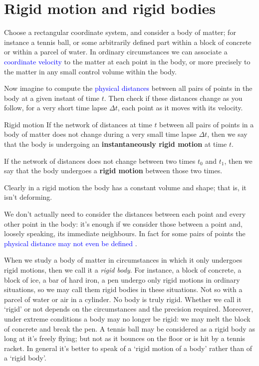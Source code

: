 \documentclass[a4paper,12pt,%
onecolumn,oneside,%
british%
]{memoir}
\newcommand*{\incr}{\Delta}%
\renewcommand*{\|}[1][]{\nonscript\:#1\vert\nonscript\:\mathopen{}}
\newcommand*{\sect}{\S}%
\renewcommand*{\autoref}[3][\sect\,\ref]{\textcolor{blue}{#3}
\raisebox{0.6ex}{\color{blue}\miniscule%
\faIcon{angle-right}%
\;#1{#2}\;p.\,\pageref{#2}}}
\newcommand*{\yti}{t_{0}}
\newcommand*{\ytf}{t_{1}}
\newcommand*{\Dt}{\incr t}
\begin{document}
\section{Rigid motion and rigid bodies}
\label{sec:rigid_bodies}

Choose a rectangular coordinate system, and consider a body of matter; for instance a tennis ball, or some arbitrarily defined part within a block of concrete or within a parcel of water. In ordinary circumstances we can associate a \autoref{sec:fluxes_velocities}{coordinate velocity} to the matter at each point in the body, or more precisely to the matter in any small control volume within the body.

Now imagine to compute the \autoref{sec:radar_distance}{physical distances} between all pairs of points in the body at a given instant of time $t$. Then check if these distances change as you follow, for a very short time lapse $\Dt$,  each point as it moves with its velocity.
%
\begin{definition}{Rigid motion}\label{def:rigid_motion}
  If the network of distances at time $t$ between all pairs of points in a body of matter does not change during a very small time lapse $\Dt$, then we say that  the body is undergoing an \textbf{instantaneously rigid motion} at time $t$.

  \smallskip

  If the network of distances does not change between two times $\yti$ and $\ytf$, then we say that the body undergoes a \textbf{rigid motion} between those two times.
\end{definition}
Clearly in a rigid motion the body has a constant volume and shape; that is, it isn't deforming.

We don't actually need to consider the distances between each point and every other point in the body: it's enough if we consider those between a point and, loosely speaking, its immediate neighbours. In fact for some pairs of points the \autoref{sec:radar_distance}{physical distance may not even be defined}.

When we study a body of matter in circumstances in which it only undergoes rigid motions, then we call it a \emph{rigid body}. For instance, a block of concrete, a block of ice, a bar of hard iron, a pen undergo only rigid motions in ordinary situations, so we may call them rigid bodies in these situations. Not so with a parcel of water or air in a cylinder. No body is truly rigid. Whether we call it \enquote*{rigid} or not depends on the circumstances and the precision required. Moreover, under extreme conditions a body may no longer be rigid: we may melt the block of concrete and break the pen. A tennis ball may be considered as a rigid body as long at it's freely flying; but not as it bounces on the floor or is hit by a tennis racket. In general it's better to speak of a \enquote*{rigid motion of a body} rather than of a \enquote*{rigid body}.
\end{document}
